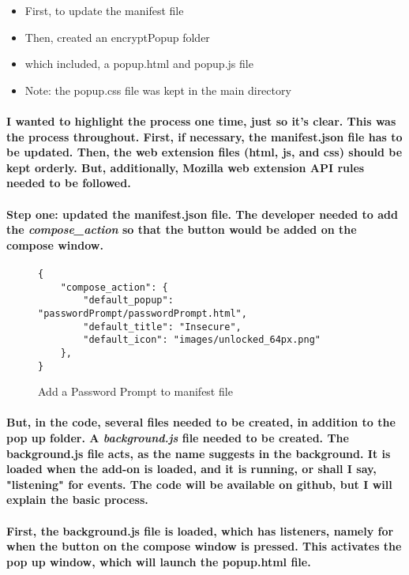 \begin{itemize}
\item First, to update the manifest file
\item Then, created an encryptPopup folder
\item which included, a popup.html and popup.js file
\item Note: the popup.css file was kept in the main directory
\end{itemize}

\paragraph{I wanted to highlight the process one time, just so it's clear. This was the process throughout. First, if necessary, the manifest.json file has to be updated. Then, the web extension files (html, js, and css) should be kept orderly. But, additionally, Mozilla web extension API rules needed to be followed.}

\paragraph{Step one: updated the manifest.json file. The developer needed to add the \emph{compose\_action} so that the button would be added on the compose window.}

\begin{figure}[H]
\centering
\begin{verbatim}
{
    "compose_action": {
        "default_popup": "passwordPrompt/passwordPrompt.html",
        "default_title": "Insecure",
        "default_icon": "images/unlocked_64px.png"
    },
}
\end{verbatim}
\caption{\label{fig: addPwToManifest} Add a Password Prompt to manifest file}
\end{figure}


\paragraph{But, in the code, several files needed to be created, in addition to the pop up folder. A \emph{background.js} file needed to be created. The background.js file acts, as the name suggests in the background. It is loaded when the add-on is loaded, and it is running, or shall I say, "listening" for events. The code will be available on github, but I will explain the basic process.}

\paragraph{First, the background.js file is loaded, which has listeners, namely for when the button on the compose window is pressed. This activates the pop up window, which will launch the popup.html file.}

